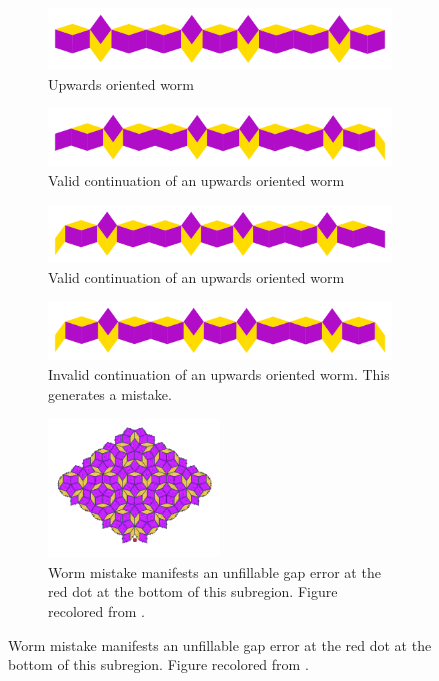 \documentclass[
  oneside,
  11pt, a4paper,
  footinclude=true,
  headinclude=true,
  cleardoublepage=empty
]{scrbook}
\begin{document}
\begin{figure}[h]
\centering
\begin{subfigure}{\textwidth}
\centering
\includegraphics[width=\textwidth]{reValidWorm0}
\caption{Upwards oriented worm}
\end{subfigure}

\begin{subfigure}{\textwidth}
\centering
\includegraphics[width=\textwidth]{reValidWorm1}
\caption{Valid continuation of an upwards oriented worm}
\end{subfigure}

\begin{subfigure}{\textwidth}
\centering
\includegraphics[width=\textwidth]{reValidWorm2}
\caption{Valid continuation of an upwards oriented worm}
\end{subfigure}

\begin{subfigure}{\textwidth}
\centering
\includegraphics[width=\textwidth]{reInvalidWorm}
\caption{Invalid continuation of an upwards oriented worm. This generates a mistake.}
\end{subfigure}

\begin{subfigure}{\textwidth}
\centering
\includegraphics[width=0.5\textwidth]{illegal}
\caption{Worm mistake manifests an unfillable gap error at the red dot at the bottom of this subregion. Figure recolored from \cite{Austin2007}.}
\end{subfigure}


\end{figure}
\end{document}
